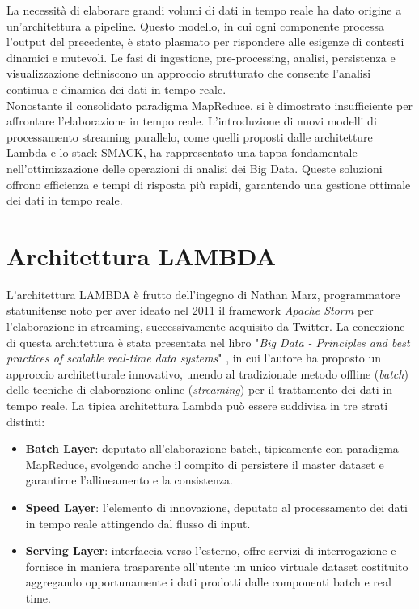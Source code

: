 La necessità di elaborare grandi volumi di dati in tempo reale ha dato origine a un'architettura a pipeline. 
Questo modello, in cui ogni componente processa l'output del precedente, è stato plasmato per rispondere alle esigenze di contesti dinamici e mutevoli. 
Le fasi di ingestione, pre-processing, analisi, persistenza e visualizzazione definiscono un approccio strutturato che consente l'analisi continua e dinamica dei dati in tempo reale. \\
Nonostante il consolidato paradigma MapReduce, si è dimostrato insufficiente per affrontare l'elaborazione in tempo reale. 
L'introduzione di nuovi modelli di processamento streaming parallelo, come quelli proposti dalle architetture Lambda e lo stack SMACK, ha rappresentato una tappa fondamentale nell'ottimizzazione delle operazioni di analisi dei Big Data. 
Queste soluzioni offrono efficienza e tempi di risposta più rapidi, garantendo una gestione ottimale dei dati in tempo reale.

\section[Architettura LAMBDA]{Architettura LAMBDA}
L'architettura LAMBDA è frutto dell'ingegno di Nathan Marz, programmatore statunitense noto per aver ideato nel 2011 il framework \textit{Apache Storm} per l'elaborazione in streaming, successivamente acquisito da Twitter.
La concezione di questa architettura è stata presentata nel libro "\textit{Big Data - Principles and best practices of scalable real-time data systems}" \cite{bigDataBook}, in cui l'autore ha proposto un approccio architetturale innovativo, unendo al tradizionale metodo offline (\textit{batch}) delle tecniche di elaborazione online (\textit{streaming}) per il trattamento dei dati in tempo reale.
La tipica architettura Lambda può essere suddivisa in tre strati distinti:
\begin{itemize}
    \item \textbf{Batch Layer}: deputato all'elaborazione batch, tipicamente con paradigma MapReduce, svolgendo anche il compito di persistere il master dataset e garantirne l'allineamento e la consistenza.
    \item \textbf{Speed Layer}: l'elemento di innovazione, deputato al processamento dei dati in tempo reale attingendo dal flusso di input.
    \item \textbf{Serving Layer}: interfaccia verso l'esterno, offre servizi di interrogazione e fornisce in maniera trasparente all'utente un unico virtuale dataset costituito aggregando opportunamente i dati prodotti dalle componenti batch e real time.
\end{itemize}

